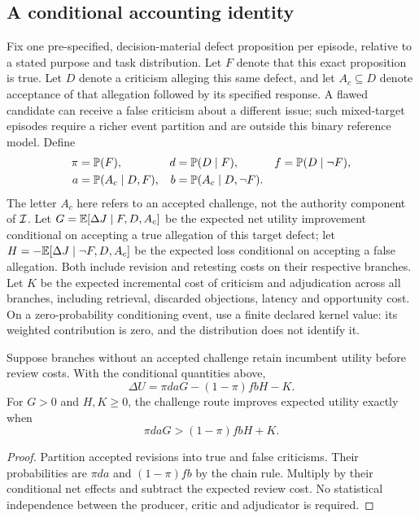\subsection{A conditional accounting identity}
Fix one pre-specified, decision-material defect proposition per episode, relative to a stated purpose and task distribution. Let $F$ denote that this exact proposition is true. Let $D$ denote a criticism alleging this same defect, and let $A_c\subseteq D$ denote acceptance of that allegation followed by its specified response. A flawed candidate can receive a false criticism about a different issue; such mixed-target episodes require a richer event partition and are outside this binary reference model. Define
\begin{align}
\pi&=\mathbb{P}(F), & d&=\mathbb{P}(D\mid F), & f&=\mathbb{P}(D\mid\neg F),\\
 a&=\mathbb{P}(A_c\mid D,F), & b&=\mathbb{P}(A_c\mid D,\neg F).
\end{align}
The letter $A_c$ here refers to an accepted challenge, not the authority component of $\mathcal{I}$. Let $G=\mathbb{E}[\Delta J\mid F,D,A_c]$ be the expected net utility improvement conditional on accepting a true allegation of this target defect; let $H=-\mathbb{E}[\Delta J\mid\neg F,D,A_c]$ be the expected loss conditional on accepting a false allegation. Both include revision and retesting costs on their respective branches. Let $K$ be the expected incremental cost of criticism and adjudication across all branches, including retrieval, discarded objections, latency and opportunity cost. On a zero-probability conditioning event, use a finite declared kernel value: its weighted contribution is zero, and the distribution does not identify it.

\begin{proposition}
\label{prop:value}
Suppose branches without an accepted challenge retain incumbent utility before review costs. With the conditional quantities above,
\begin{equation}
\boxed{\Delta U=\pi daG-(1-\pi)fbH-K.}
\label{eq:value}
\end{equation}
For $G>0$ and $H,K\geq0$, the challenge route improves expected utility exactly when
\begin{equation}
\pi daG>(1-\pi)fbH+K.
\label{eq:break}
\end{equation}
\end{proposition}
\begin{proof}
Partition accepted revisions into true and false criticisms. Their probabilities are $\pi da$ and $(1-\pi)fb$ by the chain rule. Multiply by their conditional net effects and subtract the expected review cost. No statistical independence between the producer, critic and adjudicator is required.
\end{proof}

